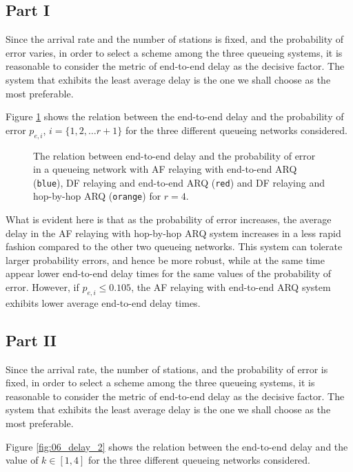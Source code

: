 \subsection{Part I}

Since the arrival rate and the number of stations is fixed, and the probability
of error varies, in order to select a scheme among the three queueing systems,
it is reasonable to consider the metric of end-to-end delay as the decisive
factor. The system that exhibits the least average delay is the one we shall
choose as the most preferable.

Figure \ref{fig:06_delay_1} shows the relation between the end-to-end delay
and the probability of error $p_{e,i}$, $i = \{1,2, \dots r+1\}$ for the three
different queueing networks considered.

\begin{figure}[H]\centering
  
  \caption{The relation between end-to-end delay and the probability of error
    in a queueing network with AF relaying with end-to-end ARQ (\texttt{blue}),
    DF relaying and end-to-end ARQ (\texttt{red}) and
    DF relaying and hop-by-hop ARQ (\texttt{orange}) for $r=4$.}
  \label{fig:06_delay_1}
\end{figure}

What is evident here is that as the probability of error increases, the average
delay in the AF relaying with hop-by-hop ARQ system increases in a less rapid
fashion compared to the other two queueing networks. This system can tolerate
larger probability errors, and hence be more robust, while at the same time
appear lower end-to-end delay times for the same values of the probability of
error. However, if $p_{e,i} \leq 0.105$, the AF relaying with end-to-end ARQ
system exhibits lower average end-to-end delay times.


\subsection{Part II}

Since the arrival rate, the number of stations, and the probability of error is
fixed, in order to select a scheme among the three queueing systems,
it is reasonable to consider the metric of end-to-end delay as the decisive
factor. The system that exhibits the least average delay is the one we shall
choose as the most preferable.

Figure \ref{fig:06_delay_2} shows the relation between the end-to-end delay
and the value of $k \in [1,4]$ for the three different queueing networks
considered.

